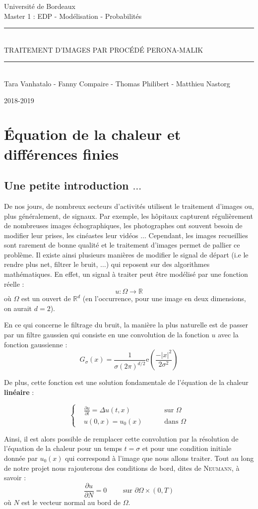 \documentclass[a4paper,12pt,twoside]{report}
\date{\today}
\newcommand{\HRule}{\rule{\linewidth}{0.5mm}}
\newcommand{\R}{\mathbb{R}}
\newcommand{\1}{\mathbb{1}}
\renewcommand{\exp}{\mathrm{e}}
\newcommand{\pagedegarde}[2]{\begin{titlepage}
		\begin{center}
			
			
			
			\LARGE Université de Bordeaux\\[2cm]
			
			\Large Master 1 : EDP - Modélisation - Probabilités\\[3cm]
			
			
			\HRule \\[0.5cm]
			{ \huge \uppercase{#1}\\[0.4cm] }
			\HRule \\[0.2cm]
			\normalsize {#2} 
			\\[0.5cm]
		\end{center}
		
		
		\vfill
		\begin{minipage}{0.6\textwidth}
			\begin{flushleft} \large
			\end{flushleft}
		\end{minipage}
		\begin{minipage}{0.4\textwidth}
			\begin{flushright} \large
				2018-2019\\
			\end{flushright}
		\end{minipage}
\end{titlepage}}
\begin{document}
	\pagedegarde{Traitement d'images par procédé Perona-Malik}{Tara Vanhatalo - Fanny Compaire - Thomas Philibert - Matthieu Nastorg}
	
	\chapter*{Équation de la chaleur et différences finies}
	
	\section{Une petite introduction $\ldots$}
	De nos jours, de nombreux secteurs d'activités utilisent le traitement d'images ou, plus généralement, de signaux. Par exemple, les hôpitaux capturent régulièrement de nombreuses images échographiques, les photographes ont souvent besoin de modifier leur prises, les cinéastes leur vidéos $\ldots$
	Cependant, les images recueillies sont rarement de bonne qualité et le traitement d'images permet de pallier ce problème. Il existe ainsi plusieurs manières de modifier le signal de départ (i.e le rendre plus net, filtrer le bruit, $\ldots$) qui reposent sur des algorithmes mathématiques. En effet, un signal à traiter peut être modélisé par une fonction réelle :
	\[
	u : \Omega \longrightarrow \mathbb{R}
	\]
	où $\Omega$ est un ouvert de $\mathbb{\R}^d$ (en l'occurrence, pour une image en deux dimensions, on aurait $d=2$).
	
	En ce qui concerne le filtrage du bruit, la manière la plus naturelle est de passer par un filtre gaussien qui consiste en une convolution de la fonction $u$ avec la fonction gaussienne : 
	\[
	G_{\sigma}(x) = \frac{1}{\sigma(2\pi)^{d/2}}\exp{(\frac{-|x|^2}{2\sigma^2})}
	\]
	
	De plus, cette fonction est une solution fondamentale de l'équation de la chaleur \textbf{linéaire} :
	
	\begin{equation*}
	\left\{
	\begin{aligned}
	&\frac{\partial u}{\partial t}=\Delta u(t,x) &\qquad \text{ sur } \Omega \\
	&u(0,x) = u_0(x) &\qquad \text{ dans } \Omega
	\end{aligned}
	\right.
	\end{equation*}
	
	Ainsi, il est alors possible de remplacer cette convolution par la résolution de l'équation de la chaleur pour un temps $t = \sigma$ et pour une condition initiale donnée par $u_0(x)$ qui correspond à l'image que nous allons traiter. Tout au long de notre projet nous rajouterons des conditions de bord, dites de \textsc{Neumann}, à savoir : 
	\[
	\frac{\partial u}{\partial N} = 0 \qquad \text{ sur } \partial\Omega \times \left(0,T\right)
	\]
	où $N$ est le vecteur normal au bord de $\Omega$. 
	
\end{document}
